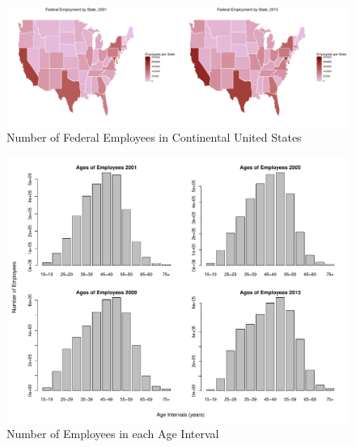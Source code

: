\documentclass{article}
\begin{document}
\begin{center}
    \begin{figure}
        \includegraphics[scale=0.3]{./images/employment-by-state-2001-2013.png}
        \caption{Number of Federal Employees in Continental United States}
        \label{employmentheatmap}
    \end{figure}
\end{center}

\begin{center}
    \begin{figure}
        \includegraphics[scale=0.3]{./images/histogram-ages-2001-2013.pdf}
        \caption{Number of Employees in each Age Interval}
        \label{agehistograms}
    \end{figure}
\end{center}

\newpage
\end{document}
